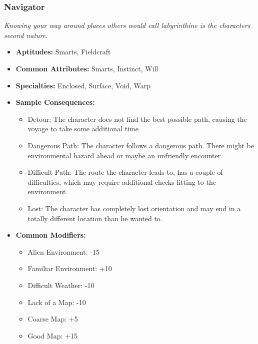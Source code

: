 \subsubsection{Navigator}\label{Navigator}
\textit{Knowing your way around places others would call labyrinthine is the characters second nature.}
\begin{itemize}
	\item \textbf{Aptitudes:} Smarts, Fieldcraft
	\item \textbf{Common Attributes:} Smarts, Instinct, Will
	\item \textbf{Specialties:} Enclosed, Surface, Void, Warp
	\item \textbf{Sample Consequences:} 
	\begin{itemize}
		\item Detour: The character does not find the best possible path, causing the voyage to take some additional time
		\item Dangerous Path: The character follows a dangerous path. There might be environmental hazard ahead or maybe an unfriendly encounter.
		\item Difficult Path: The route the character leads to, has a couple of difficulties, which may require additional checks fitting to the environment.
		\item Lost: The character has completely lost orientation and may end in a totally different location than he wanted to. 
	\end{itemize}
	\item \textbf{Common Modifiers:}
	\begin{itemize}
 		\item Alien Environment: -15
 		\item Familiar Environment: +10
 		\item Difficult Weather: -10
 		\item Lack of a Map: -10
 		\item Coarse Map: +5
 		\item Good Map: +15
	\end{itemize}
\end{itemize}


